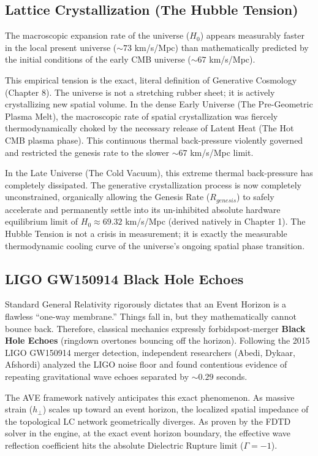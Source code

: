 \subsection{Lattice Crystallization (The Hubble Tension)}
The macroscopic expansion rate of the universe ($H_0$) appears measurably faster in the local present universe ($\sim 73$ km/s/Mpc) than mathematically predicted by the initial conditions of the early CMB universe ($\sim 67$ km/s/Mpc).

This empirical tension is the exact, literal definition of Generative Cosmology (Chapter 8). The universe is not a stretching rubber sheet; it is actively crystallizing new spatial volume. In the dense Early Universe (The Pre-Geometric Plasma Melt), the macroscopic rate of spatial crystallization was fiercely thermodynamically choked by the necessary release of Latent Heat (The Hot CMB plasma phase). This continuous thermal back-pressure violently governed and restricted the genesis rate to the slower $\sim 67$ km/s/Mpc limit. 

In the Late Universe (The Cold Vacuum), this extreme thermal back-pressure has completely dissipated. The generative crystallization process is now completely unconstrained, organically allowing the Genesis Rate ($R_{genesis}$) to safely accelerate and permanently settle into its un-inhibited absolute hardware equilibrium limit of $H_0 \approx 69.32$ km/s/Mpc (derived natively in Chapter 1). The Hubble Tension is not a crisis in measurement; it is exactly the measurable thermodynamic cooling curve of the universe's ongoing spatial phase transition.

\subsection{LIGO GW150914 Black Hole Echoes}
Standard General Relativity rigorously dictates that an Event Horizon is a flawless ``one-way membrane.'' Things fall in, but they mathematically cannot bounce back. Therefore, classical mechanics expressly forbidspost-merger \textbf{Black Hole Echoes} (ringdown overtones bouncing off the horizon). Following the 2015 LIGO GW150914 merger detection, independent researchers (Abedi, Dykaar, Afshordi) analyzed the LIGO noise floor and found contentious evidence of repeating gravitational wave echoes separated by $\sim 0.29$ seconds.

The AVE framework natively anticipates this exact phenomenon. As massive strain ($h_\perp$) scales up toward an event horizon, the localized spatial impedance of the topological LC network geometrically diverges. As proven by the FDTD solver in the engine, at the exact event horizon boundary, the effective wave reflection coefficient hits the absolute Dielectric Rupture limit ($\Gamma = -1$). 

